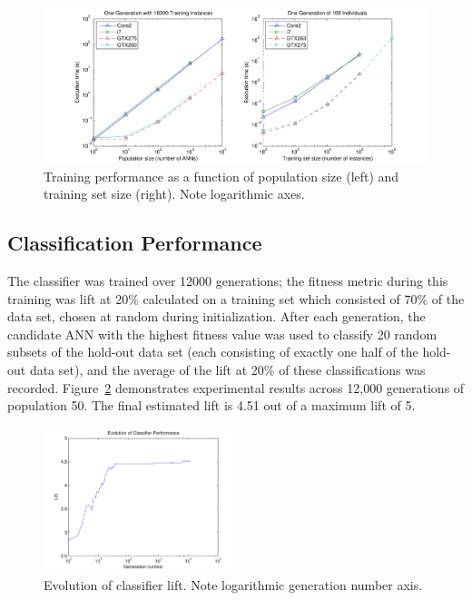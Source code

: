 \documentclass[11pt]{article}       %
\begin{document}
\begin{figure}[h]
	\centering
	\includegraphics[width=\textwidth]{fig-performance}
	\caption{Training performance as a function of population size (left) and training set size (right). Note logarithmic axes.}
	\label{fig:training-performance}
\end{figure}

\subsection{Classification Performance} \label{results}
The classifier was trained over 12000 generations; the fitness metric during this training was lift at 20\% calculated on a training set which consisted of 70\% of the data set, chosen at random during initialization.  After each generation, the candidate ANN with the highest fitness value was used to classify 20 random subsets of the hold-out data set (each consisting of exactly one half of the hold-out data set), and the average of the lift at 20\% of these classifications was recorded.  Figure~\ref{fig:evolution-lift} demonstrates experimental results across 12,000 generations of population 50. The final estimated lift is 4.51 out of a maximum lift of 5.

\begin{figure}[h]
	\centering
	\includegraphics[width=0.5\textwidth]{fig-evolution-lift}
	\caption{Evolution of classifier lift. Note logarithmic generation number axis.}
	\label{fig:evolution-lift}
\end{figure}
\end{document}
